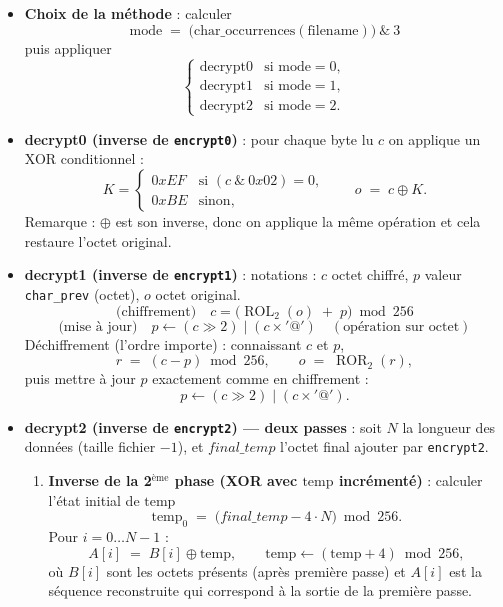 \begin{itemize}
\item \textbf{Choix de la méthode } : calculer
\[
\text{mode} \;=\; \big(\text{char\_occurrences}(\text{filename})\big)\ \&\ 3
\]
puis appliquer
\[
\begin{cases}
\text{decrypt0} & \text{si }\text{mode}=0,\\
\text{decrypt1} & \text{si }\text{mode}=1,\\
\text{decrypt2} & \text{si }\text{mode}=2.
\end{cases}
\]

\item \textbf{decrypt0 (inverse de \texttt{encrypt0})} : pour chaque byte lu \(c\) on applique un XOR conditionnel :
\[
K=\begin{cases}
0xEF &\text{si }(c\ \&\ 0x02)=0,\\[4pt]
0xBE &\text{sinon},
\end{cases}
\qquad
o \;=\; c \oplus K.
\]
Remarque : \( \oplus \) est son inverse, donc on applique la même opération et cela restaure l'octet original.

\item \textbf{decrypt1 (inverse de \texttt{encrypt1})} : notations : \(c\) octet chiffré, \(p\) valeur \texttt{char\_prev} (octet), \(o\) octet original.
\[
\text{(chiffrement)}\quad c = \big(\operatorname{ROL}_2(o)\; +\; p\big)\bmod 256
\]
\[
\text{(mise à jour)}\quad p \leftarrow (c\gg 2)\;|\;(c\times '@') \quad(\text{opération sur octet})
\]
Déchiffrement (l'ordre importe) : connaissant \(c\) et \(p\),
\[
r \;=\; (c - p)\bmod 256,\qquad o \;=\; \operatorname{ROR}_2(r),
\]
puis mettre à jour \(p\) exactement comme en chiffrement :
\[
p \leftarrow (c\gg 2)\;|\;(c\times '@').
\]

\item \textbf{decrypt2 (inverse de \texttt{encrypt2}) — deux passes} : soit \(N\) la longueur des données (taille fichier \(-1\)), et \(final\_temp\) l'octet final ajouter par \texttt{encrypt2}.

\begin{enumerate}
\item \textbf{Inverse de la 2\(^\text{ème}\) phase (XOR avec \(\text{temp}\) incrémenté)} : calculer l'état initial de \(\text{temp}\)
\[
\text{temp}_0 \;=\; \big(final\_temp - 4\cdot N\big)\bmod 256.
\]
Pour \(i=0\ldots N-1\) :
\[
A[i] \;=\; B[i] \oplus \text{temp},\qquad \text{temp}\leftarrow (\text{temp}+4)\bmod 256,
\]
où \(B[i]\) sont les octets présents (après première passe) et \(A[i]\) est la séquence reconstruite qui correspond à la sortie de la première passe.


\end{enumerate}
\end{itemize}

